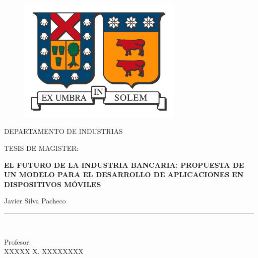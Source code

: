 \documentclass[a4paper,openright,12pt]{book}
\begin{document}
\thispagestyle{empty}

\begin{titlepage}

\begin{center}
\vspace*{-1in}
\begin{figure}[htb]
\begin{center}
\includegraphics[width=8cm]{./img/usm.jpg}
\end{center}
\end{figure}

DEPARTAMENTO DE INDUSTRIAS \\
\vspace*{0.6in}
\begin{large}
TESIS DE MAGISTER:\\
\end{large}
\vspace*{0.2in}
\begin{Large}
\textbf{EL FUTURO DE LA INDUSTRIA BANCARIA: PROPUESTA DE UN MODELO PARA EL DESARROLLO DE APLICACIONES EN DISPOSITIVOS MÓVILES} \\
\end{Large}
\vspace*{0.3in}
\begin{large}
Javier Silva Pacheco\\
\end{large}
\vspace*{0.3in}
\rule{80mm}{0.1mm}\\
\vspace*{0.1in}
\begin{large}
Profesor: \\
XXXXX X. XXXXXXXX \\
\end{large}
\end{center}

\end{titlepage}
\end{document}
